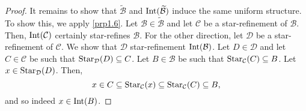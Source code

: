 \begin{prp}
\begin{proof}
It remains to show that $\widetilde{\mathcal{B}}$ and $\operatorname{Int} (\widetilde{\mathcal{B}})$ induce the same uniform structure.  To show this, we apply \cref{prp1.6}.  Let $\mathcal{B}\in \widetilde{\mathcal{B}}$ and let $\mathcal{C}$ be a star-refinement of $\mathcal{B}$.  Then, $\operatorname{Int} (\mathcal{C})$ certainly star-refines $\mathcal{B}$.  For the other direction, let $\mathcal{D}$ be a star-refinement of $\mathcal{C}$.  We show that $\mathcal{D}$ star-refinement $\operatorname{Int} (\mathcal{B})$.  Let $D\in \mathcal{D}$ and let $C\in \mathcal{C}$ be such that $\operatorname{Star} _{\mathcal{D}}(D)\subseteq C$.  Let $B\in \mathcal{B}$ be such that $\operatorname{Star} _{\mathcal{C}}(C)\subseteq B$.  Let $x\in \operatorname{Star} _{\mathcal{D}}(D)$.  Then,
\begin{equation}
x\in C\subseteq \operatorname{Star} _{\mathcal{C}}(x)\subseteq \operatorname{Star} _{\mathcal{C}}(C)\subseteq B,
\end{equation}
and so indeed $x\in \operatorname{Int} (B)$.
\end{proof}
\end{prp}

